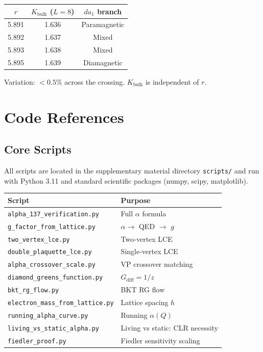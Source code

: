 \documentclass[aps,prd,onecolumn,superscriptaddress,floatfix,12pt]{revtex4-2}
\newcommand{\Kbulk}{K_{\text{bulk}}}
\newcommand{\Gdiff}{G_{\text{diff}}}
\begin{document}
\begin{table}[h]
\begin{tabular}{ccc}
\toprule
$r$ & $\Kbulk$ ($L{=}8$) & $da_1$ branch \\
\midrule
5.891 & 1.636 & Paramagnetic \\
5.892 & 1.637 & Mixed \\
5.893 & 1.638 & Mixed \\
5.895 & 1.639 & Diamagnetic \\
\bottomrule
\end{tabular}
\end{table}

Variation: $< 0.5\%$ across the crossing. $\Kbulk$ is independent of $r$.

\section{Code References}\label{sec:C}

\subsection{Core Scripts}

All scripts are located in the supplementary material directory \texttt{scripts/} and run with Python 3.11 and standard scientific packages (numpy, scipy, matplotlib).

\begin{table}[h]
\begin{tabular}{ll}
\toprule
Script & Purpose \\
\midrule
\texttt{alpha\_137\_verification.py} & Full $\alpha$ formula \\
\texttt{g\_factor\_from\_lattice.py} & $\alpha \to$ QED $\to$ $g$ \\
\texttt{two\_vertex\_lce.py} & Two-vertex LCE \\
\texttt{double\_plaquette\_lce.py} & Single-vertex LCE \\
\texttt{alpha\_crossover\_scale.py} & VP crossover matching \\
\texttt{diamond\_greens\_function.py} & $\Gdiff = 1/z$ \\
\texttt{bkt\_rg\_flow.py} & BKT RG flow \\
\texttt{electron\_mass\_from\_lattice.py} & Lattice spacing $h$ \\
\texttt{running\_alpha\_curve.py} & Running $\alpha(Q)$ \\
\texttt{living\_vs\_static\_alpha.py} & Living vs static: CLR necessity \\
\texttt{fiedler\_proof.py} & Fiedler sensitivity scaling \\
\bottomrule
\end{tabular}
\end{table}
\end{document}

